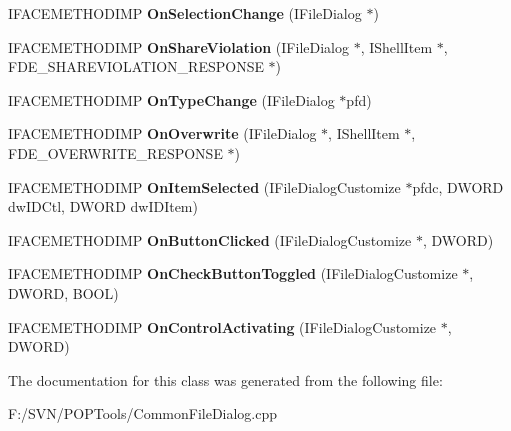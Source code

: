 \begin{DoxyCompactItemize}
\item 
\hypertarget{class_c_dialog_event_handler_ad1e341f5b5297c7b506d4b1e54a046cb}{I\-F\-A\-C\-E\-M\-E\-T\-H\-O\-D\-I\-M\-P {\bfseries On\-Selection\-Change} (I\-File\-Dialog $\ast$)}\label{class_c_dialog_event_handler_ad1e341f5b5297c7b506d4b1e54a046cb}

\item 
\hypertarget{class_c_dialog_event_handler_ae59130cbe514d9bb9faa9abaefcb91d8}{I\-F\-A\-C\-E\-M\-E\-T\-H\-O\-D\-I\-M\-P {\bfseries On\-Share\-Violation} (I\-File\-Dialog $\ast$, I\-Shell\-Item $\ast$, F\-D\-E\-\_\-\-S\-H\-A\-R\-E\-V\-I\-O\-L\-A\-T\-I\-O\-N\-\_\-\-R\-E\-S\-P\-O\-N\-S\-E $\ast$)}\label{class_c_dialog_event_handler_ae59130cbe514d9bb9faa9abaefcb91d8}

\item 
\hypertarget{class_c_dialog_event_handler_ac66c6e4a0e279074b8cc5a3fd786dc57}{I\-F\-A\-C\-E\-M\-E\-T\-H\-O\-D\-I\-M\-P {\bfseries On\-Type\-Change} (I\-File\-Dialog $\ast$pfd)}\label{class_c_dialog_event_handler_ac66c6e4a0e279074b8cc5a3fd786dc57}

\item 
\hypertarget{class_c_dialog_event_handler_a3bdc33d10116a6fc3d37b38a3843a1d5}{I\-F\-A\-C\-E\-M\-E\-T\-H\-O\-D\-I\-M\-P {\bfseries On\-Overwrite} (I\-File\-Dialog $\ast$, I\-Shell\-Item $\ast$, F\-D\-E\-\_\-\-O\-V\-E\-R\-W\-R\-I\-T\-E\-\_\-\-R\-E\-S\-P\-O\-N\-S\-E $\ast$)}\label{class_c_dialog_event_handler_a3bdc33d10116a6fc3d37b38a3843a1d5}

\item 
\hypertarget{class_c_dialog_event_handler_af3dd1df9281e0657adc7396dd0a419e1}{I\-F\-A\-C\-E\-M\-E\-T\-H\-O\-D\-I\-M\-P {\bfseries On\-Item\-Selected} (I\-File\-Dialog\-Customize $\ast$pfdc, D\-W\-O\-R\-D dw\-I\-D\-Ctl, D\-W\-O\-R\-D dw\-I\-D\-Item)}\label{class_c_dialog_event_handler_af3dd1df9281e0657adc7396dd0a419e1}

\item 
\hypertarget{class_c_dialog_event_handler_a88ab5f708ec246ab1fc4b766b0df1512}{I\-F\-A\-C\-E\-M\-E\-T\-H\-O\-D\-I\-M\-P {\bfseries On\-Button\-Clicked} (I\-File\-Dialog\-Customize $\ast$, D\-W\-O\-R\-D)}\label{class_c_dialog_event_handler_a88ab5f708ec246ab1fc4b766b0df1512}

\item 
\hypertarget{class_c_dialog_event_handler_a62f11342b7eb9b0f753033324eefc2f3}{I\-F\-A\-C\-E\-M\-E\-T\-H\-O\-D\-I\-M\-P {\bfseries On\-Check\-Button\-Toggled} (I\-File\-Dialog\-Customize $\ast$, D\-W\-O\-R\-D, B\-O\-O\-L)}\label{class_c_dialog_event_handler_a62f11342b7eb9b0f753033324eefc2f3}

\item 
\hypertarget{class_c_dialog_event_handler_a8c65afdb53848363c0c11f50aa15a92f}{I\-F\-A\-C\-E\-M\-E\-T\-H\-O\-D\-I\-M\-P {\bfseries On\-Control\-Activating} (I\-File\-Dialog\-Customize $\ast$, D\-W\-O\-R\-D)}\label{class_c_dialog_event_handler_a8c65afdb53848363c0c11f50aa15a92f}

\end{DoxyCompactItemize}


The documentation for this class was generated from the following file\-:\begin{DoxyCompactItemize}
\item 
F\-:/\-S\-V\-N/\-P\-O\-P\-Tools/Common\-File\-Dialog.\-cpp\end{DoxyCompactItemize}
